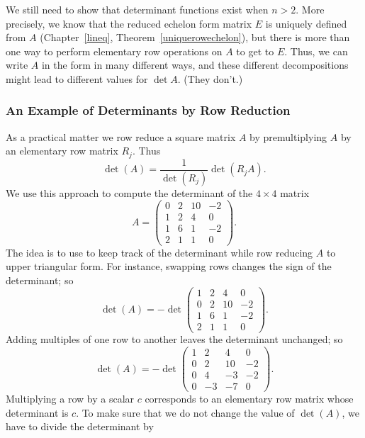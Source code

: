 \documentclass{ximera}
\begin{document}
We still need to show that determinant functions exist when $n>2$.  More 
precisely, we know that the reduced echelon form matrix $E$ is uniquely 
defined from $A$ (Chapter~\ref{lineq}, Theorem~\ref{uniquerowechelon}), but 
there is more than one way to perform elementary row operations on $A$ to 
get to $E$.  Thus, we can write $A$ in the form  in many 
different ways, and these different decompositions might lead to different 
values for $\det A$.  (They don't.)

\subsubsection*{An Example of Determinants by Row Reduction}

As a practical matter we row reduce a square matrix $A$ by 
premultiplying $A$ by an elementary row matrix $R_j$.  Thus 
\begin{equation} \label{e:pracdet}
\det(A) = \frac{1}{\det(R_j)} \det (R_j A).
\end{equation}
We use this approach to compute the determinant of the 
$4\times 4$ matrix 
\[
A = \left(\begin{array}{rrrr} 0 & 2 & 10 & -2 \\ 1 & 2 & 4 & 0\\
1 & 6 & 1 & -2 \\ 2 & 1 & 1 & 0 \end{array}\right).
\]
The idea is to use  to keep track of the 
determinant while row reducing $A$ to upper triangular form. 
For instance, swapping rows changes the sign of the determinant; 
so
\[
\det(A) = -\det\left(\begin{array}{rrrr} 1 & 2 & 4 & 0\\ 0 & 2 & 10 & -2 \\
1 & 6 & 1 & -2 \\ 2 & 1 & 1 & 0 \end{array}\right).
\]
Adding multiples of one row to another leaves the determinant
unchanged; so
\[
\det(A) = -\det\left(\begin{array}{rrrr} 1 & 2 & 4 & 0\\ 0 & 2 & 10 & -2 \\
0 & 4 & -3 & -2 \\ 0 & -3 & -7 & 0 \end{array}\right).
\]
Multiplying a row by a scalar $c$ corresponds to an elementary 
row matrix whose determinant is $c$.  To make sure that we do not 
change the value of $\det(A)$, we have to divide the determinant by 
\end{document}
